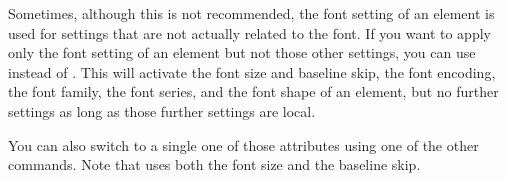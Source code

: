 \begin{Declaration}
\end{Declaration}
Sometimes, although this is not recommended,
the font setting of an element is used for settings that are not actually
related to the font. If you want to apply only the font setting of an element
but not those other settings, you can use  instead of
. This will activate the font
size and baseline skip, the font encoding, the font family, the font series,
and the font shape of an element, but no further settings as long as those
further settings are local.

You can also switch to a single one of those attributes using one of the other
commands. Note that  uses both the font
size and the baseline skip.%
%
%
\EndIndexGroup
%
\EndIndexGroup

